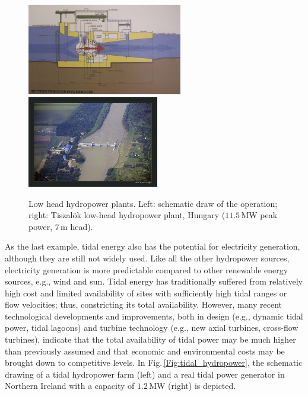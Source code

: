 \begin{figure}[ht!]
	\centering
		\includegraphics[height=4cm]{HydroAndWindPower/Figures/Shematics_Of_Low_Head_Hydropower.jpg}
		\includegraphics[height=4cm]{HydroAndWindPower/Figures/Tiszalok_Low_Head_Hydropower.jpg}
	\caption{Low head hydropower plants. Left: schematic draw of the operation; right: Tiszal\"ok low-head hydropower plant, Hungary ($11.5\,\mathrm{MW}$ peak power, $7\,\mathrm{m}$ head).}
	\label{Fig:low_head_hydropower}
\end{figure}

As the last example, tidal energy also has the potential for electricity generation, although they are still not widely used. Like all the other hydropower sources, electricity generation is more predictable compared to other renewable energy sources, e.g., wind and sun. Tidal energy has traditionally suffered from relatively high cost and limited availability of sites with sufficiently high tidal ranges or flow velocities; thus, constricting its total availability. However, many recent technological developments and improvements, both in design (e.g., dynamic tidal power, tidal lagoons) and turbine technology (e.g., new axial turbines, cross-flow turbines), indicate that the total availability of tidal power may be much higher than previously assumed and that economic and environmental costs may be brought down to competitive levels. In Fig.\,\ref{Fig:tidal_hydropower}, the schematic drawing of a tidal hydropower farm (left) and a real tidal power generator in Northern Ireland with a capacity of $1.2\,\mathrm{MW}$ (right) is depicted.

